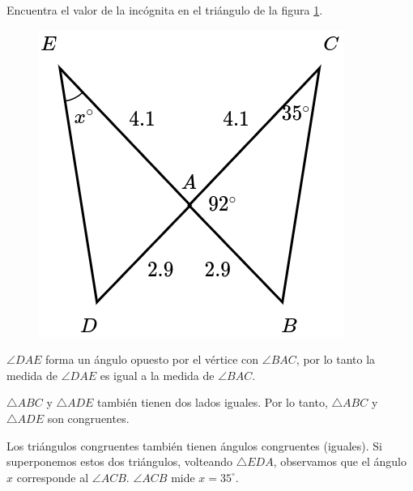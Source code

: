 Encuentra el valor de la incógnita en el triángulo de la figura \ref{fig:angle_triangle_37}.

\begin{minipage}[t][][t]{0.35\textwidth}
    \begin{figure}[H]
        \centering
        \includegraphics[width=0.8\linewidth]{../images/angle_triangle_37.png}
        \caption{}
        \label{fig:angle_triangle_37}
    \end{figure}
\end{minipage}\hfill
\begin{minipage}[t][][t]{0.6\textwidth}
    \begin{solutionbox}{4.5cm}
        $\angle DAE$ forma un ángulo opuesto por el vértice con $\angle BAC$, por lo tanto la medida de $\angle DAE$ es igual a la medida de $\angle BAC$.

        $\triangle ABC$ y $\triangle ADE$ también tienen dos lados iguales. Por lo tanto,
        $\triangle ABC$ y $\triangle ADE$ son congruentes.

        Los triángulos congruentes también tienen ángulos congruentes (iguales). Si superponemos estos dos triángulos, volteando $\triangle EDA$, observamos que el ángulo $x$ corresponde al $\angle ACB$.
        $\angle ACB$ mide $x=35^\circ$.
    \end{solutionbox}
\end{minipage}

